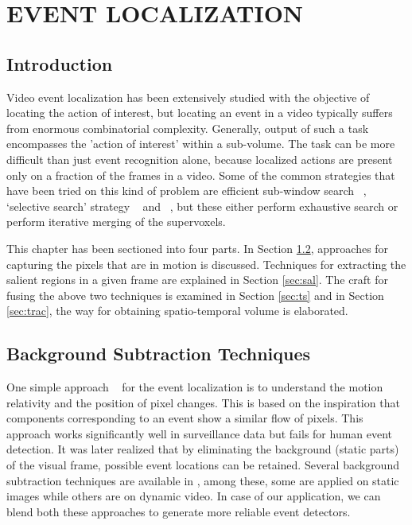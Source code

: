 \chapter{EVENT LOCALIZATION}
 \label{chap:eventLo}
\section{Introduction}
Video event localization has been extensively studied with the objective of locating the action of interest, but locating an event in a video typically suffers from enormous combinatorial complexity.  Generally, output of such a task encompasses the 'action of interest' within a sub-volume.  The task can be more difficult than just event recognition alone, because localized actions are present only on a fraction of the frames in a video.  Some of the common strategies that have been tried on this kind of problem are efficient sub-window search ~\citep{subwindowsearch}, `selective search' strategy ~\citep{selectivesearch}  and ~\cite{tubelet}, but these either perform exhaustive search or perform iterative merging of the supervoxels. 

\par This chapter has been sectioned into four parts.  In Section \ref{sec:bst}, approaches for capturing the pixels that are in motion is discussed.  Techniques for extracting the salient regions in a given frame are explained in Section \ref{sec:sal}.  The craft for fusing the above two techniques is examined in Section \ref{sec:ts} and in Section \ref{sec:trac}, the way for obtaining spatio-temporal volume is elaborated.

\section{Background Subtraction Techniques} 
 \label{sec:bst}
\par One simple approach ~\citep{Basharat08} for the event localization is to understand the motion relativity and the position of pixel changes. This is based on the inspiration that components corresponding to an event show a similar flow of pixels.  This approach works significantly well in surveillance data but fails for human event detection.  It was later realized that by eliminating the background (static parts) of the visual frame,  possible event locations can be retained.  Several background subtraction techniques are available in \cite{Piccardi04}, among these, some are applied on static images while others are on dynamic video.  In case of our application, we can blend both these approaches to generate more reliable event detectors.

